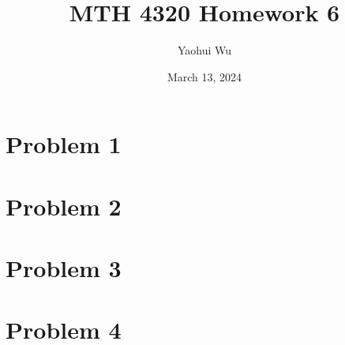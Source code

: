 \documentclass[12pt]{article}
\title{MTH 4320 Homework 6}
\author{Yaohui Wu}
\date{March 13, 2024}
\begin{document}
\maketitle
\section*{Problem 1}
\section*{Problem 2}
\section*{Problem 3}
\section*{Problem 4}
\end{document}
